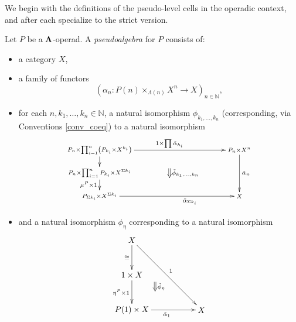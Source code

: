 We begin with the definitions of the pseudo-level cells in the operadic context, and after each specialize to the strict version.

\begin{Defi}\label{def:ps-alg}
Let $P$ be a $\mathbf{\Lambda}$-operad. A \textit{pseudoalgebra} for $P$ consists of: 
    \begin{itemize}
        \item a category $X$,
        \item a family of functors
            \[
                \left(\alpha_n \colon P(n) \times_{\Lambda(n)} X^n \rightarrow X \right)_{n \in \mathbb{N}},
            \]
        \item for each $n, k_1, \ldots, k_n \in \mathbb{N}$, a natural isomorphism $\phi_{k_1, \ldots, k_n}$ (corresponding, via Conventions \ref{conv_coeq}) to a natural isomorphism
            \[
                \xy
                    (0,0)*+{\scriptstyle P_n \times \prod_{i=1}^n \left(P_{k_i} \times X^{k_i}\right)}="00";
                    (0,-10)*+{\scriptstyle P_n \times \prod_{i=1}^n P_{k_i} \times X^{\Sigma k_i}}="01";
                    (0,-20)*+{\scriptstyle P_{\Sigma k_i} \times X^{\Sigma k_i}}="02";
                    (60,-20)*+{\scriptstyle X}="12";
                    (60,0)*+{\scriptstyle P_n \times X^n}="11";
                    {\ar_{} "00" ; "01"};
                    {\ar^{1 \times \prod \tilde{\alpha}_{k_i}} "00" ; "11"};
                    {\ar^{\tilde{\alpha}_n} "11" ; "12"};
                    {\ar_{\mu^P \times 1} "01" ; "02"};
                    {\ar_>>>>>>>>>>>>>>>>>>>{\tilde{\alpha}_{\Sigma k_i}} "02" ; "12"};
                    {\ar@{=>}^{\tilde{\phi}_{k_1, \ldots, k_n}} (30,-8) ; (30,-12)};
                \endxy
            \]

               \item and a natural isomorphism $\phi_{\eta}$ corresponding to a natural isomorphism
            \[
                \xy
                    (0,0)*+{X}="00";
                    (0,-15)*+{1 \times X}="x10";
                    (0,-30)*+{P(1) \times X}="10";
                    (30,-30)*+{X}="11";
                    {\ar_{\eta^P \times 1} "x10" ; "10"};
                    {\ar_{\tilde{\alpha}_1} "10" ; "11"};
                    {\ar^{1} "00" ; "11"};
                    {\ar_{\cong} "00" ; "x10"};
                    {\ar@{=>}^{\tilde{\phi}_\eta} (10,-18) ; (10,-22)};
                \endxy
            \]


\end{itemize}
\end{Defi}
